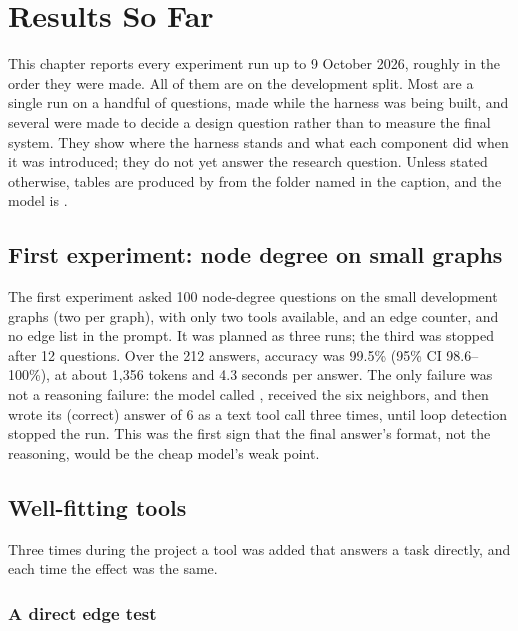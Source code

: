 \chapter{Results So Far}
\label{ch:results}

This chapter reports every experiment run up to 9 October 2026, roughly in the order they were made. All of them are on
the development split. Most are a single run on a handful of questions, made while the harness was being built, and
several were made to decide a design question rather than to measure the final system. They show where the harness
stands and what each component did when it was introduced; they do not yet answer the research question. Unless
stated otherwise, tables are produced by  from the folder named in the caption, and the
model is .

\section{First experiment: node degree on small graphs}

The first experiment asked 100 node-degree questions on the small development graphs (two per graph), with only two
tools available,  and an edge counter, and no edge list in the prompt. It was planned as three
runs; the third was stopped after 12 questions. Over the 212 answers, accuracy was 99.5\% (95\% CI 98.6--100\%), at
about 1,356 tokens and 4.3 seconds per answer. The only failure was not a reasoning failure: the model called
, received the six neighbors, and then wrote its (correct) answer of 6 as a text tool call three
times, until loop detection stopped the run. This was the first sign that the final answer's format, not the
reasoning, would be the cheap model's weak point.

\section{Well-fitting tools}

Three times during the project a tool was added that answers a task directly, and each time the effect was the same.

\subsection{A direct edge test}

